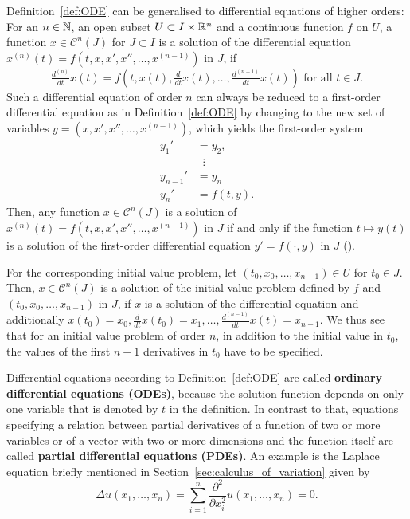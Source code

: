 \begin{rmk}
	Definition~\ref{def:ODE} can be generalised to differential equations of higher orders: For an $n\in\mathbb{N}$, an open subset $U\subset I\times \mathbb{R}^n$ and a continuous function $f$ on $U$, a function $x\in\mathcal{C}^n(J)$ for $J\subset I$ is a solution of the differential equation $x^{(n)}(t) = f(t,x, x', x'',\dots, x^{(n-1)})$ in $J$, if 
	$$
	\tfrac{d^{(n)}}{dt} x(t) = f(t,x(t),\tfrac{d}{dt}x(t), \dots, \tfrac{d^{(n-1)}}{dt}x(t)) \text{~for all~} t\in J.
	$$
	Such a differential equation of order $n$ can always be reduced to a first-order differential equation as in Definition~\ref{def:ODE} by changing to the new set of variables $y = (x, x', x'', \dots, x^{(n-1)})$, which yields the first-order system
	\begin{equation*}
		\begin{split}
			y_1' &= y_2, \\
			&\;\;\vdots \\
			y_{n-1}' &= y_n \\
			y_n' &= f(t,y).
		\end{split}
	\end{equation*}
	Then, any function $x\in\mathcal{C}^n(J)$ is a solution of $x^{(n)}(t) = f(t,x, x', x'',\dots, x^{(n-1)})$ in $J$ if and only if the function $t\mapsto y(t)$ is a solution of the first-order differential equation $y' = f(\cdot, y)$ in $J$ (\cite[p.~7]{Teschl2012}). 
	
	For the corresponding initial value problem, let $(t_0,x_0,\dots, x_{n-1})\in U$ for $t_0\in J$. Then, $x\in\mathcal{C}^n(J)$ is a solution of the initial value problem defined by $f$ and $(t_0,x_0,\dots, x_{n-1})$ in $J$, if $x$ is a solution of the differential equation and additionally $x(t_0) = x_0, \frac{d}{dt}x(t_0) = x_1,\dots, \frac{d^{(n-1)}}{dt} x(t) = x_{n-1}$. 
	We thus see that for an initial value problem of order $n$, in addition to the initial value in $t_0$, the values of the first $n-1$ derivatives in $t_0$ have to be specified. 
\end{rmk}

\begin{rmk}
	Differential equations according to Definition~\ref{def:ODE} are called \textbf{ordinary differential equations (ODEs)}, because the solution function depends on only one variable that is denoted by $t$ in the definition. In contrast to that, equations specifying a relation between partial derivatives of a function of two or more variables or of a vector with two or more dimensions and the function itself are called \textbf{partial differential equations (PDEs)}. An example is the Laplace equation briefly mentioned in Section~\ref{sec:calculus_of_variation} given by 
	$$
	\Delta u(x_1,\dots, x_n) = \sum_{i=1}^{n} \frac{\partial^2}{\partial x_i^2}u(x_1,\dots, x_n) = 0.
	$$
\end{rmk}

